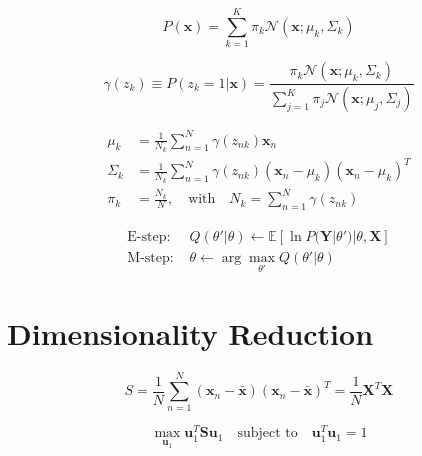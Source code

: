 \documentclass{article}
\begin{document}
\begin{equation}
    P(\mathbf{x}) = \sum_{k=1}^K \pi_k \mathcal{N}(\mathbf{x}; \mu_k, \Sigma_k)
\end{equation}

\begin{equation}
    \gamma(z_k) \equiv P(z_k = 1 | \mathbf{x}) = \frac{\pi_k \mathcal{N}(\mathbf{x}; \mu_k, \Sigma_k)}{\sum_{j=1}^K \pi_j \mathcal{N}(\mathbf{x}; \mu_j, \Sigma_j)}
\end{equation}

\begin{equation}
    \begin{aligned}
        \mu_k &= \frac{1}{N_k} \sum_{n=1}^N \gamma(z_{nk}) \mathbf{x}_n \\
        \Sigma_k &= \frac{1}{N_k} \sum_{n=1}^N \gamma(z_{nk}) (\mathbf{x}_n - \mu_k)(\mathbf{x}_n - \mu_k)^T \\
        \pi_k &= \frac{N_k}{N}, \quad \text{with} \quad N_k = \sum_{n=1}^N \gamma(z_{nk})
    \end{aligned}
\end{equation}

\begin{equation}
    \begin{aligned}
        \text{E-step: } & Q(\theta' | \theta) \leftarrow \mathbb{E}[\ln P(\mathbf{Y} | \theta') | \theta, \mathbf{X}] \\
        \text{M-step: } & \theta \leftarrow \arg\max_{\theta'} Q(\theta' | \theta)
    \end{aligned}
\end{equation}


\section{Dimensionality Reduction}

\begin{equation}
    S = \frac{1}{N} \sum_{n=1}^N (\mathbf{x}_n - \bar{\mathbf{x}})(\mathbf{x}_n - \bar{\mathbf{x}})^T = \frac{1}{N} \mathbf{X}^T \mathbf{X}
\end{equation}

\begin{equation}
    \max_{\mathbf{u}_1} \mathbf{u}_1^T \mathbf{S} \mathbf{u}_1 \quad \text{subject to} \quad \mathbf{u}_1^T \mathbf{u}_1 = 1
\end{equation}
\end{document}
